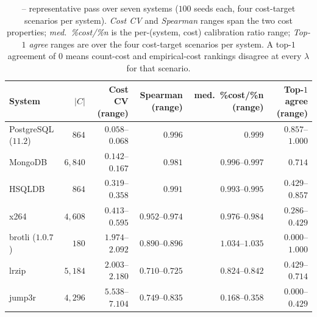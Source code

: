 \begin{table}[t]
\centering
\caption{\StudyEnergy -- representative pass over seven systems
($100$ seeds each, four cost-target scenarios per system).
\emph{Cost CV} and \emph{Spearman} ranges span the two cost
properties; \emph{med.\ \%cost/\%n} is the per-(system, cost)
calibration ratio range; \emph{Top-$1$ agree} ranges are over the
four cost-target scenarios per system. A top-$1$ agreement of $0$
means count-cost and empirical-cost rankings disagree at every
$\lambda$ for that scenario.}
\label{tab:twins-summary}
\footnotesize
\setlength{\tabcolsep}{4.5pt}
\begin{tabular}{l r r r r r}
\toprule
System & $|C|$ & Cost CV (range) & Spearman (range) & med.\ \%cost/\%n (range) & Top-$1$ agree (range) \\
\midrule
PostgreSQL ($11.2$) & $864$    & $0.058$--$0.068$ & $0.996$         & $0.999$         & $0.857$--$1.000$ \\
MongoDB             & $6{,}840$ & $0.142$--$0.167$ & $0.981$         & $0.996$--$0.997$ & $0.714$         \\
HSQLDB              & $864$    & $0.319$--$0.358$ & $0.991$         & $0.993$--$0.995$ & $0.429$--$0.857$ \\
x264                & $4{,}608$ & $0.413$--$0.595$ & $0.952$--$0.974$ & $0.976$--$0.984$ & $0.286$--$0.429$ \\
brotli ($1.0.7$)    & $180$    & $1.974$--$2.092$ & $0.890$--$0.896$ & $1.034$--$1.035$ & $0.000$--$1.000$ \\
lrzip               & $5{,}184$ & $2.003$--$2.180$ & $0.710$--$0.725$ & $0.824$--$0.842$ & $0.429$--$0.714$ \\
jump3r              & $4{,}296$ & $5.538$--$7.104$ & $0.749$--$0.835$ & $0.168$--$0.358$ & $0.000$--$0.429$ \\
\bottomrule
\end{tabular}
\end{table}

